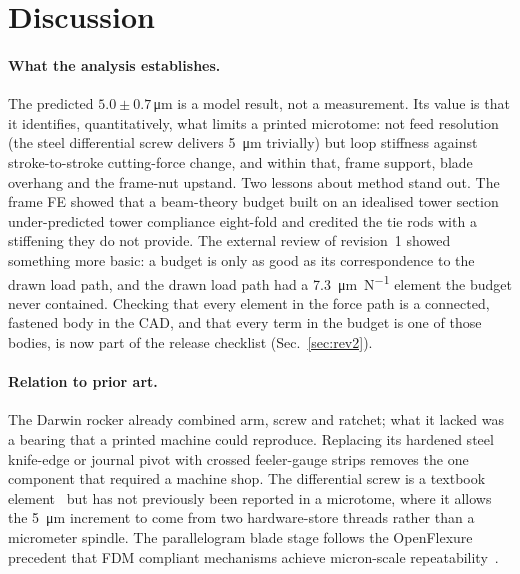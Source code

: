 \documentclass[11pt,a4paper]{article}
\begin{document}
\FloatBarrier
\section{Discussion}
\paragraph{What the analysis establishes.} The predicted $5.0\pm0.7$\,\si{\micro\metre} is a model result, not a measurement. Its value is that it identifies, quantitatively, what limits a printed microtome: not feed resolution (the steel differential screw delivers \SI{5}{\micro\metre} trivially) but loop stiffness against stroke-to-stroke cutting-force change, and within that, frame support, blade overhang and the frame-nut upstand. Two lessons about method stand out. The frame FE showed that a beam-theory budget built on an idealised tower section under-predicted tower compliance eight-fold and credited the tie rods with a stiffening they do not provide. The external review of revision~1 showed something more basic: a budget is only as good as its correspondence to the drawn load path, and the drawn load path had a \SI{7.3}{\micro\metre\per\newton} element the budget never contained. Checking that every element in the force path is a connected, fastened body in the CAD, and that every term in the budget is one of those bodies, is now part of the release checklist (Sec.~\ref{sec:rev2}).

\paragraph{Relation to prior art.} The Darwin rocker already combined arm, screw and ratchet; what it lacked was a bearing that a printed machine could reproduce. Replacing its hardened steel knife-edge or journal pivot with crossed feeler-gauge strips removes the one component that required a machine shop. The differential screw is a textbook element~\citep{SmithChetwynd2017} but has not previously been reported in a microtome, where it allows the \SI{5}{\micro\metre} increment to come from two hardware-store threads rather than a micrometer spindle. The parallelogram blade stage follows the OpenFlexure precedent that FDM compliant mechanisms achieve micron-scale repeatability~\citep{Sharkey2016}.
\end{document}
